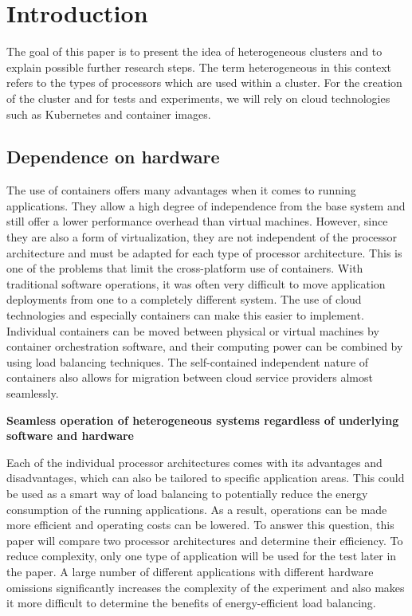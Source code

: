 \section{Introduction}
The goal of this paper is to present the idea of heterogeneous clusters and to explain possible further research steps. The term heterogeneous in this context refers to the types of processors which are used within a cluster. For the creation of the cluster and for tests and experiments, we will rely on cloud technologies such as Kubernetes and container images. 

\subsection{Dependence on hardware}
The use of containers offers many advantages when it comes to running applications. They allow a high
degree of independence from the base system and still offer a lower performance
overhead than virtual machines. However, since they are also a form of
virtualization, they are not independent of the processor architecture and must
be adapted for each type of processor architecture. This is one of the problems
that limit the cross-platform use of containers.  With traditional software
operations, it was often very difficult to move application deployments from one to a
completely different system. The use of cloud technologies and especially
containers can make this easier to implement. Individual containers can be
moved between physical or virtual machines by container orchestration software,
and their computing power can be combined by using load balancing techniques.
The self-contained independent nature of containers also allows for migration
between cloud service providers almost seamlessly.

\begin{center}
    \textbf{Seamless operation of heterogeneous systems regardless of underlying software and hardware}
\end{center}

Each of the individual processor
architectures comes with its advantages and disadvantages, which can also be
tailored to specific application areas. This could be used as a smart way of
load balancing to potentially reduce the energy consumption of the running
applications. As a result, operations can be made more efficient and
operating costs can be lowered. To answer this question, this paper will
compare two processor architectures and determine their efficiency. To reduce
complexity, only one type of application will be used for the test later in the
paper. A large number of different applications with different hardware
omissions significantly increases the complexity of the experiment and also
makes it more difficult to determine the benefits of energy-efficient load
balancing.

